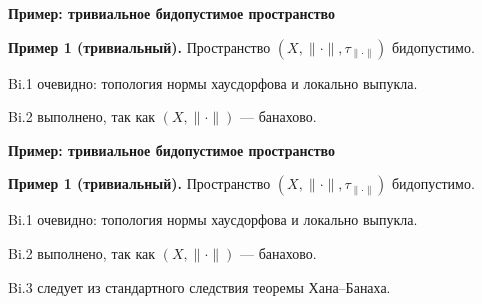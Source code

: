 \documentclass[11pt]{article}
\begin{document}
\begin{center}
{\color{notaeYELLOW}\bfseries\fontsize{44}{52}\selectfont Пример: тривиальное бидопустимое пространство}
\end{center}
\vspace*{\fill}
\begin{center}
\fontsize{36}{43}\selectfont
\parbox{\linewidth}{\centering\noindent \textbf{Пример 1 (тривиальный).} Пространство $(X,\|\cdot\|,\tau_{\|\cdot\|})$ бидопустимо.
\par}\vspace{0.4in}
\parbox{\linewidth}{\centering\noindent Bi.1 очевидно: топология нормы хаусдорфова и локально выпукла.
\par}\vspace{0.4in}
\parbox{\linewidth}{\centering\noindent Bi.2 выполнено, так как $(X,\|\cdot\|)$ --- банахово.
\par}\vspace{0.4in}
\end{center}
\vspace*{\fill}

\newpage

\begin{center}
{\color{notaeYELLOW}\bfseries\fontsize{44}{52}\selectfont Пример: тривиальное бидопустимое пространство}
\end{center}
\vspace*{\fill}
\begin{center}
\fontsize{36}{43}\selectfont
\parbox{\linewidth}{\centering\noindent \textbf{Пример 1 (тривиальный).} Пространство $(X,\|\cdot\|,\tau_{\|\cdot\|})$ бидопустимо.
\par}\vspace{0.4in}
\parbox{\linewidth}{\centering\noindent Bi.1 очевидно: топология нормы хаусдорфова и локально выпукла.
\par}\vspace{0.4in}
\parbox{\linewidth}{\centering\noindent Bi.2 выполнено, так как $(X,\|\cdot\|)$ --- банахово.
\par}\vspace{0.4in}
\parbox{\linewidth}{\centering\noindent Bi.3 следует из стандартного следствия теоремы Хана--Банаха.
\par}\vspace{0.4in}
\end{center}
\vspace*{\fill}

\newpage
\end{document}

